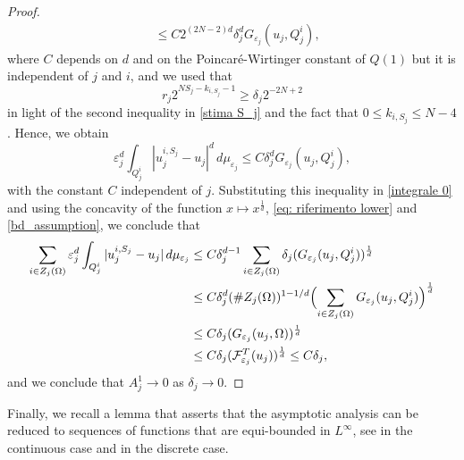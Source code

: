 \documentclass{article}
\theoremstyle{plain}
\theoremstyle{definition}
\newcommand{\ej}{\varepsilon_j}
\newcommand{\dej}{\delta_j}
\numberwithin{equation}{section}
\begin{document}
\begin{proof}
\begin{align*}
     & \leq C 2^{(2N-2)d}\dej^d G_{\varepsilon_j}(u_j,Q^i_j),
    \end{align*}
    where $C$ depends on $d$ and on the Poincaré-Wirtinger constant of $Q(1)$ but it is independent of $j$ and $i$, and we used that
    \begin{equation*}
        r_j 2^{NS_j-k_{i,S_j}-1}\geq \dej 2^{-2N+2}
    \end{equation*}
    in light of the second inequality in \eqref{stima S_j} and the fact that $0\leq k_{i,S_j}\leq N-4$. Hence, we obtain
    \begin{equation*}
        \ej^d\int_{Q^i_j}|u^{i,S_j}_j-u_j|^d\, d\mu_{\ej}\leq C\delta_j^d G_{\varepsilon_j}(u_j,Q^i_j),
    \end{equation*}
    with the constant $C$ independent of $j$. Substituting this inequality in \eqref{integrale 0} and using the concavity of the function $x \mapsto x^{\frac{1}{d}}$, \eqref{eq: riferimento lower} and \eqref{bd_assumption}, we conclude that
    \begin{equation*}
        \begin{split}
              \sum_{i \in Z_j(\Omega)} \ej^d\int_{Q_j^i}|u^{i,S_j}_j-u_j|\, d\mu_{\ej} &\leq C\delta_j^{d-1}\sum_{i \in Z_j(\Omega)}\delta_j(G_{\varepsilon_j}(u_j,Q^i_j))^{\frac{1}{d}} \\
            &            \leq C\delta^d_j(\#Z_j(\Omega))^{1-1/d}\Bigl(\sum_{i \in Z_j(\Omega)}G_{\varepsilon_j}(u_j,Q^i_j)\Bigr)^{\frac{1}{d}}\\
            &\leq C\delta_j(G_{\varepsilon_j}(u_j,\Omega))^{\frac{1}{d}}\\
            &\leq C\delta_{j}(\mathcal{F}^{T}_{\varepsilon_{j}}(u_{j}))^{\frac{1}{d}} \leq C\delta_{j},
            \end{split}
            \end{equation*}
            and we conclude that $A_j^1\to 0$ as $\delta_j\rightarrow 0$.
    \end{proof}

Finally, we recall a lemma that asserts that the asymptotic analysis can be reduced to sequences of functions that are equi-bounded in $L^\infty$, see \cite[Lemma 6.2]{AGL}  in the continuous case and \cite[Lemma 7.2]{Sig-dis} in the discrete case.
 
\end{document}
